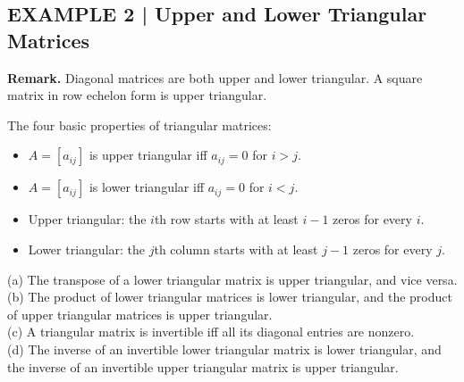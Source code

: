 \documentclass{article}
\theoremstyle{mystyle}
\begin{document}
\subsection*{EXAMPLE 2 | Upper and Lower Triangular Matrices}

\begin{center}
\end{center}

\vspace{2mm}
\noindent\textbf{Remark.} Diagonal matrices are both upper and lower triangular. A square matrix in row echelon form is upper triangular.

The four basic properties of triangular matrices:
\begin{itemize}\setlength\itemsep{0pt}
  \item $A=[a_{ij}]$ is upper triangular iff $a_{ij}=0$ for $i>j$.
  \item $A=[a_{ij}]$ is lower triangular iff $a_{ij}=0$ for $i<j$.
  \item Upper triangular: the $i$th row starts with at least $i-1$ zeros for every $i$.
  \item Lower triangular: the $j$th column starts with at least $j-1$ zeros for every $j$.
\end{itemize}

\begin{tcolorbox}[colback=red!4, colframe=red!60!black, title=Theorem 1.7.1, boxrule=0.5mm, arc=3mm]
(a) The transpose of a lower triangular matrix is upper triangular, and vice versa.\\
(b) The product of lower triangular matrices is lower triangular, and the product of upper triangular matrices is upper triangular.\\
(c) A triangular matrix is invertible iff all its diagonal entries are nonzero.\\
(d) The inverse of an invertible lower triangular matrix is lower triangular, and the inverse of an invertible upper triangular matrix is upper triangular.
\end{tcolorbox}
\end{document}
